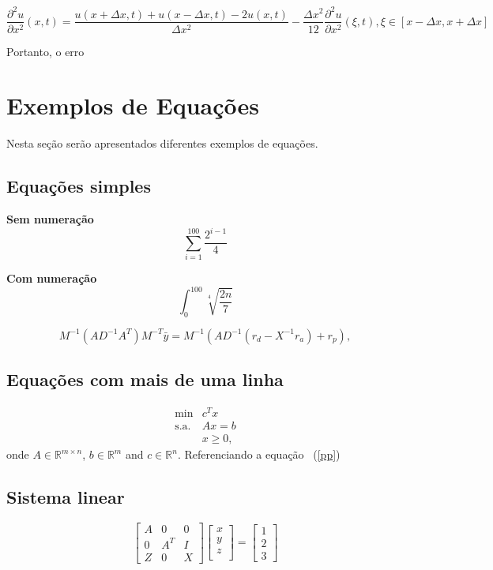 \documentclass[12pt,fleqn]{article}
\newcommand{\Rn}{{\ensuremath{\mathbb{R}}}^{n}}
\newcommand{\Rm}{{\ensuremath{\mathbb{R}}}^{m}}
\newcommand{\Rmn}{{\ensuremath{\mathbb{R}}}^{{m}\times{n}}}
\begin{document}
\begin{equation}
	\frac{\partial^2 u}{\partial x^2}(x, t) = \frac{u(x + \Delta x, t) + u(x - \Delta x, t) - 2 u(x, t)}{\Delta x^2} - \frac{\Delta x^2}{12} \frac{\partial^2 u}{\partial x^2} (\xi, t), \xi \in [x - \Delta x, x + \Delta x]
\end{equation}

Portanto, o erro

\section{Exemplos de Equações}
Nesta seção serão apresentados diferentes exemplos de equações.

\subsection{Equações simples}

\textbf{Sem numeração}
\[\sum_{i=1}^{100}\frac{2^{i-1}}{4}\]

\textbf{Com numeração}
\begin{equation}
	\int_{0}^{100}\sqrt[4]{\frac{2n}{7}}
\end{equation}

\begin{equation}
M^{-1}(AD^{-1}A^T)M^{-T}\bar{y} = M^{-1}(AD^{-1}(r_d -X^{-1}r_a) + r_p),
\end{equation}


\subsection{Equações com mais de uma linha}
\begin{eqnarray}
\label{pp}
\min & c^Tx \\ \nonumber
\mbox{s.a.} & Ax=b \\ \nonumber
            & x \geq 0, \nonumber
\end{eqnarray}
onde $A \in \Rmn$, $b \in \Rm$ and $c \in \Rn$.
Referenciando a equação ~(\ref{pp})

\subsection{Sistema linear}

\begin{equation}
 \left[
\begin{array}{ccc}
 A & 0   & 0 \\
 0 & A^T & I\\
 Z & 0   & X
\end{array} \right]
\left[
\begin{array}{c}
 x \\
 y \\
 z \\
\end{array}
\right]
=
\left[
\begin{array}{c}
 1 \\
 2 \\
 3
\end{array}
\right]
\label{eqpc0}
\end{equation}
\end{document}
